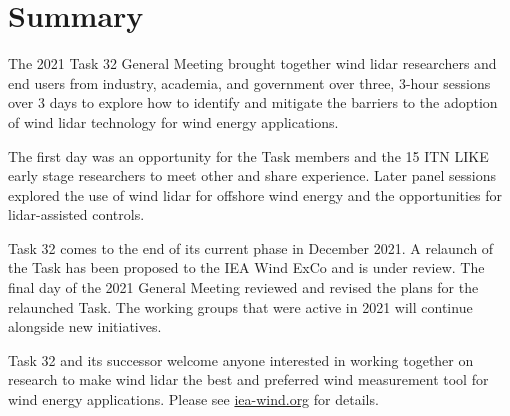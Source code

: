 \section{Summary}
The 2021 Task 32 General Meeting brought together wind lidar researchers and end users from industry, academia, and government over three, 3-hour sessions over 3 days to explore how to identify and mitigate the barriers to the adoption of wind lidar technology for wind energy applications.

The first day was an opportunity for the Task members and the 15 ITN LIKE early stage researchers to meet other and share experience. Later panel sessions explored the use of wind lidar for offshore wind energy and the opportunities for lidar-assisted controls.

Task 32 comes to the end of its current phase in December 2021. A relaunch of the Task has been proposed to the IEA Wind ExCo and is under review. The final day of the 2021 General Meeting reviewed and revised the plans for the relaunched Task. The working groups that were active in 2021 will continue alongside new initiatives.

Task 32 and its successor welcome anyone interested in working together on research to make wind lidar the best and preferred wind measurement tool for wind energy applications. Please see \href{https://iea-wind.org/task32/}{iea-wind.org} for details.
